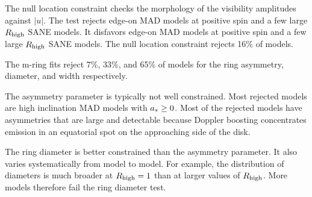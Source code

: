 

The null location constraint checks the morphology of the visibility amplitudes against $|u|$.  The test rejects edge-on MAD models at positive spin and a few large $R_\mathrm{high}$ SANE models.
It disfavors edge-on MAD models at positive spin and a few large $R_\mathrm{high}$ SANE models.  The null location constraint rejects 16\% of models.

\label{sec:mring}

The m-ring fits reject 7\%, 33\%, and 65\% of models for the ring asymmetry, diameter, and width respectively.

The asymmetry parameter is typically not well constrained. Most rejected models are high inclination MAD models with $a_* \ge 0$.  Most of the rejected models have asymmetries that are large and detectable because Doppler boosting concentrates emission in an equatorial spot on the approaching side of the disk.


The ring diameter is better constrained than the asymmetry parameter.  It also varies systematically from model to model.  For example, the distribution of diameters is much broader at $R_\mathrm{high} = 1$ than at larger values of $R_\mathrm{high}$.  More models therefore fail the ring diameter test.

